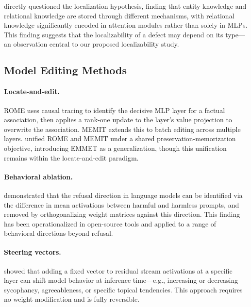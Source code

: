 \documentclass[11pt]{article}
\begin{document}
\citet{wei2024localization} directly questioned the localization hypothesis, finding that entity knowledge and relational knowledge are stored through different mechanisms, with relational knowledge significantly encoded in attention modules rather than solely in MLPs. This finding suggests that the localizability of a defect may depend on its type---an observation central to our proposed localizability study.

\subsection{Model Editing Methods}

\paragraph{Locate-and-edit.} ROME \citep{meng2022locating} uses causal tracing to identify the decisive MLP layer for a factual association, then applies a rank-one update to the layer's value projection to overwrite the association. MEMIT \citep{meng2023mass} extends this to batch editing across multiple layers. \citet{gupta2024unified} unified ROME and MEMIT under a shared preservation-memorization objective, introducing EMMET as a generalization, though this unification remains within the locate-and-edit paradigm.

\paragraph{Behavioral ablation.} \citet{arditi2024refusal} demonstrated that the refusal direction in language models can be identified via the difference in mean activations between harmful and harmless prompts, and removed by orthogonalizing weight matrices against this direction. This finding has been operationalized in open-source tools \citep{heretic2024,obliteratus2024} and applied to a range of behavioral directions beyond refusal.

\paragraph{Steering vectors.} \citet{turner2023steering} showed that adding a fixed vector to residual stream activations at a specific layer can shift model behavior at inference time---e.g., increasing or decreasing sycophancy, agreeableness, or specific topical tendencies. This approach requires no weight modification and is fully reversible.
\end{document}
